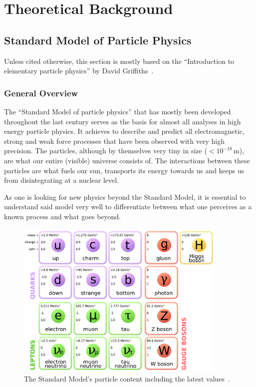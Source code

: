 \chapter{Theoretical Background}
\pagestyle{fancy}
\section{Standard Model of Particle Physics}

Unless cited otherwise, this section is mostly based on the ``Introduction to elementary particle physics'' by David Griffiths~\cite{griffiths}.

\subsection{General Overview}
\label{sec:stdmdloverview}

The ``Standard Model of particle physics'' that has mostly been developed throughout the last century serves as the basis for almost all analyses in high energy particle physics. It achieves to describe and predict all electromagnetic, strong and weak force processes that have been observed with very high precision. The particles, although by themselves very tiny in size ($< 10^{-18}\,\text{m}$), are what our entire (visible) universe consists of. The interactions between these particles are what fuels our sun, transports its energy towards us and keeps us from disintegrating at a nuclear level.


As one is looking for new physics beyond the Standard Model, it is essential to understand said model very well to differentiate between what one perceives as a known process and what goes beyond.

\begin{figure}[ht!]
  \centering
    \includegraphics[width=0.9\textwidth]{plots/Standard_Model_of_Elementary_Particles.pdf}
  \caption{The Standard Model's particle content including the latest values~\cite{stdmdlparticles,pdg}.}
  \label{fig:standardmodel}
\end{figure}


